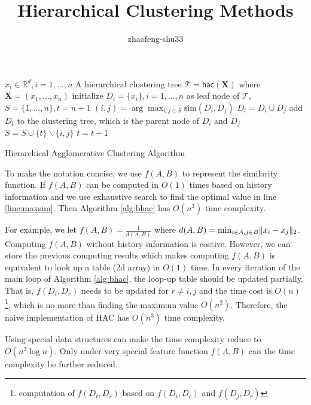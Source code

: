 \documentclass{article}
\title{Hierarchical Clustering Methods}
\author{zhaofeng-shu33}
\DeclarePairedDelimiter\abs{\lvert}{\rvert}
\DeclarePairedDelimiter\norm{\lVert}{\rVert}
\begin{document}
\maketitle
\begin{algorithm}\label{alg:bhac}
	\begin{algorithmic}[1]
		\REQUIRE $x_i \in \mathbb{R}^d, i=1,\dots, n$
		\ENSURE A hierarchical clustering tree $\mathcal{T} = \textsf{hac}(\mathbf{X})$ where $\mathbf{X}=(x_1,\dots, x_n)$
		\STATE initialize $D_i = \{x_i\}, i=1,\dots, n$ as leaf node of $\mathcal{T}$, $S=\{1, \dots, n\}, t=n+1$
		\STATE\label{line:maxsim} $(i,j) = \arg\max_{i,j \in S} \textrm{sim}(D_i, D_j)$
		\STATE $D_t = D_i \cup D_j$
		\STATE add $D_t$ to the clustering tree, which is the parent node of $D_i$ and $D_j$
		\STATE $S = S\cup \{t\}\backslash \{i, j\}$
		\STATE $t=t+1$
		\ENDWHILE
	\end{algorithmic}
\caption{Hierarchical Agglomerative Clustering Algorithm}
\end{algorithm}
To make the notation concise, we use $f(A,B)$ to represent the similarity function. If $f(A,B)$ can be computed in $O(1)$ times based on history information and we use exhaustive search to find the optimal value in line \ref{line:maxsim}. Then Algorithm \ref{alg:bhac} has $O(n^3)$ time complexity.

For example, we let $f(A,B) = \frac{1}{d(A,B)}$ where $d(A,B)=\min_{i\in A, j\in B} \norm{x_i - x_j}_2$. Computing $f(A,B)$ without history information is costive. However, we can store the previous computing results which makes computing $f(A,B)$ is equivalent to look up a table (2d array) in $O(1)$ time. In every iteration of the main loop of Algorithm \ref{alg:bhac}, the loop-up table should be updated partially. That is,  $f(D_t, D_r)$ needs to be updated for $r\neq i,j$ and the time cost is $O(n)$\footnote{computation of $f(D_t, D_r)$ based on $f(D_i, D_r)$ and $f(D_j, D_r)$}, which is no more than finding the maximum value $O(n^2)$. Therefore, the naive implementation of HAC has $O(n^3)$ time complexity. 

Using special data structures can make the time complexity reduce to $O(n^2 \log n)$.
Only under very special feature function $f(A,B)$ can the time complexity be further reduced.
\end{document}
